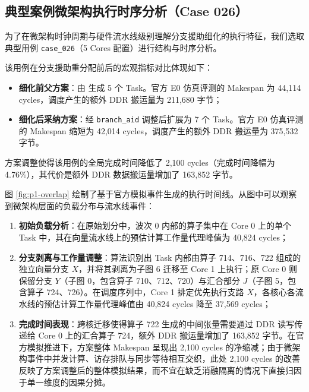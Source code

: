 \documentclass[anonymous,notoc]{gmcm2026}
\providecommand{\tightlist}{\setlength{\itemsep}{0pt}\setlength{\parskip}{0pt}}
\begin{document}
\subsection{典型案例微架构执行时序分析（Case 026）}

为了在微架构时钟周期与硬件流水线级别理解分支援助细化的执行特征，我们选取典型用例 \texttt{case\_026}（5 Cores 配置）进行结构与时序分析。

该用例在分支援助重分配前后的宏观指标对比体现如下：

\begin{itemize}
\tightlist
\item
  \textbf{细化前父方案}：由 \texttt{} 生成 5 个 Task。官方 E0 仿真评测的 Makespan 为 44,114 cycles，调度产生的额外 DDR 搬运量为 211,680 字节；
\item
  \textbf{细化后采纳方案}：经 \texttt{branch\_aid} 调整后扩展为 7 个 Task。官方 E0 仿真评测的 Makespan 缩短为 42,014 cycles，调度产生的额外 DDR 搬运量为 375,532 字节。
\end{itemize}

方案调整使得该用例的全局完成时间降低了 2,100 cycles（完成时间降幅为 4.76\%），其代价是额外 DDR 数据搬运量增加了 163,852 字节。

图 \ref{fig:p1-overlap} 绘制了基于官方模拟事件生成的执行时间线。从图中可以观察到微架构层面的负载分布与流水线事件：

\begin{enumerate}
\def\labelenumi{\arabic{enumi}.}
\tightlist
\item
  \textbf{初始负载分析}：在原始划分中，波次 0 内部的算子集中在 Core 0 上的单个 Task 中，其在向量流水线上的预估计算工作量代理峰值为 40,824 cycles；
\item
  \textbf{分支剥离与工作量调整}：算法识别出 Task 内部由算子 714、716、722 组成的独立向量分支 \(X\)，并将其剥离为子图 6 迁移至 Core 1 上执行；原 Core 0 则保留分支 \(Y\)（子图 0，包含算子 710、712、720）与汇合部分 \(J\)（子图 5，包含算子 724、726）。在调度序列中，Core 1 排定优先执行支路 \(X\)，各核心各流水线的预估计算工作量代理峰值由 40,824 cycles 降至 37,569 cycles；
\item
  \textbf{完成时间表现}：跨核迁移使得算子 722 生成的中间张量需要通过 DDR 读写传递给 Core 0 上的汇合算子 724，额外 DDR 搬运量增加了 163,852 字节。在官方模拟推进下，方案整体 Makespan 呈现出 2,100 cycles 的净缩减；由于微架构事件中并发计算、访存排队与同步等待相互交织，此处 2,100 cycles 的改善反映了方案调整后的整体模拟结果，而不宜在缺乏消融隔离的情况下直接归因于单一维度的因果分摊。
\end{enumerate}
\end{document}
